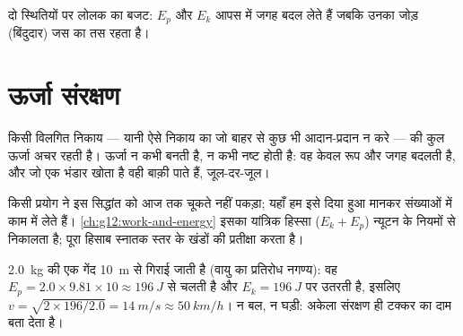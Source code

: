 \begin{omfigure}
\qquad
{}

{\small दो स्थितियों पर लोलक का बजट: $E_p$ और $E_k$ आपस में जगह बदल
लेते हैं जबकि उनका जोड़ (बिंदुदार) जस का तस रहता है।}
\end{omfigure}

\section{ऊर्जा संरक्षण}

\begin{theorem}[ऊर्जा संरक्षण]\label{thm:g10:energy-conservation:conservation}
किसी विलगित निकाय --- यानी ऐसे निकाय का जो बाहर से कुछ भी आदान-प्रदान न
करे --- की कुल ऊर्जा अचर रहती है। ऊर्जा न कभी बनती है, न
कभी नष्ट होती है: वह केवल रूप और जगह बदलती है, और जो एक भंडार खोता है वही
बाक़ी पाते हैं, जूल-दर-जूल।
\end{theorem}
\admitted

\begin{remark}\label{rem:g10:energy-conservation:admitted}
किसी प्रयोग ने इस सिद्धांत को आज तक चूकते नहीं पकड़ा; यहाँ हम इसे दिया
हुआ मानकर संख्याओं में काम में लेते हैं। \cref{ch:g12:work-and-energy} इसका यांत्रिक हिस्सा
($E_k + E_p$) न्यूटन के नियमों से निकालता है; पूरा हिसाब स्नातक स्तर के खंडों
की प्रतीक्षा करता है।
\end{remark}

\begin{example}[मुक्त गिरावट, जूलों में]\label{ex:g10:energy-conservation:fall}
\qty{2.0}{kg} की एक गेंद \qty{10}{m} से गिराई जाती है (वायु का प्रतिरोध नगण्य): वह
$E_p = 2.0 \times 9.81 \times 10 \approx \qty{196}{J}$ से चलती है और $E_k = \qty{196}{J}$ पर उतरती है, इसलिए $v = \sqrt{2 \times 196/2.0} =
\qty{14}{m/s} \approx \qty{50}{km/h}$। न बल, न
घड़ी: अकेला संरक्षण ही टक्कर का दाम बता देता है।
\end{example}

